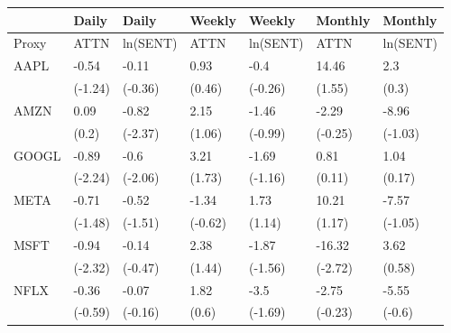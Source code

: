 \begin{tabular}{lllllll}
\toprule
{} &    Daily &     Daily &   Weekly &    Weekly &  Monthly &   Monthly \\
\midrule
Proxy &     ATTN &  ln(SENT) &     ATTN &  ln(SENT) &     ATTN &  ln(SENT) \\
AAPL  &    -0.54 &     -0.11 &     0.93 &      -0.4 &    14.46 &       2.3 \\
      &  (-1.24) &   (-0.36) &   (0.46) &   (-0.26) &   (1.55) &     (0.3) \\
AMZN  &     0.09 &     -0.82 &     2.15 &     -1.46 &    -2.29 &     -8.96 \\
      &    (0.2) &   (-2.37) &   (1.06) &   (-0.99) &  (-0.25) &   (-1.03) \\
GOOGL &    -0.89 &      -0.6 &     3.21 &     -1.69 &     0.81 &      1.04 \\
      &  (-2.24) &   (-2.06) &   (1.73) &   (-1.16) &   (0.11) &    (0.17) \\
META  &    -0.71 &     -0.52 &    -1.34 &      1.73 &    10.21 &     -7.57 \\
      &  (-1.48) &   (-1.51) &  (-0.62) &    (1.14) &   (1.17) &   (-1.05) \\
MSFT  &    -0.94 &     -0.14 &     2.38 &     -1.87 &   -16.32 &      3.62 \\
      &  (-2.32) &   (-0.47) &   (1.44) &   (-1.56) &  (-2.72) &    (0.58) \\
NFLX  &    -0.36 &     -0.07 &     1.82 &      -3.5 &    -2.75 &     -5.55 \\
      &  (-0.59) &   (-0.16) &    (0.6) &   (-1.69) &  (-0.23) &    (-0.6) \\
\bottomrule
\end{tabular}
